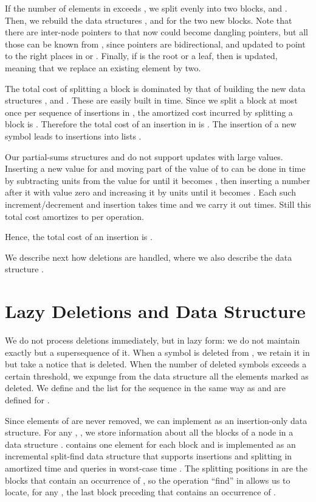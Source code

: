 \documentclass[11pt]{article}
\begin{document}
If the number of elements in  exceeds 
, we split  evenly into two blocks,  and 
.
Then, we rebuild the data structures ,  and  for the two new blocks.
Note that there are inter-node pointers to  that now could
become dangling pointers, but all those can be known from , since
pointers are bidirectional, and updated to point to the right places in
 or .
Finally, if  is the root or a leaf, then  is updated,
meaning that we replace an existing element by two.

The total cost of splitting a block is dominated by that
of building the new data structures ,  and .
These are easily built in  time. Since
we split a block  at most once per sequence of  
insertions in , the amortized cost incurred by splitting a block 
is . Therefore the total cost of an insertion in  is .
The insertion of a new 
symbol leads to  insertions into 
lists . 

Our partial-sums structures  and  do not support updates with large 
values. Inserting a new value for  and moving part of the value 
of  to  can be done in 
 time by subtracting  units from
the value for  until it becomes , then inserting a number after
it with value zero and increasing it by  units until it becomes
. Each such increment/decrement and insertion takes
 time \cite[Lem.~1]{NS10} and we carry it out
 times. Still this total cost amortizes to  per operation.

Hence, the total cost of an insertion is .

We describe next how deletions are handled, where
we also describe the data structure . 

\section{Lazy Deletions and Data Structure }
\label{sec:rank}

We do not process deletions immediately, but in lazy form: we do not
maintain exactly  but a supersequence  of it. When a symbol  is 
deleted from , we retain it in  but take a notice that 
 is deleted. When the number of deleted symbols exceeds 
a certain threshold, we expunge from the data structure all the elements 
marked as deleted.
We define  and the list  for the sequence 
 in the same way as  and  are defined for 
.

Since elements of  are never removed, we can implement 
 as an insertion-only data structure. For any 
, , we store information about all the blocks 
of a node  in a data structure . 
 contains one element for each block  and is 
implemented as an incremental split-find data structure that supports 
insertions and splitting in  amortized time and queries in  
worst-case time 
\cite{IA84}. The splitting positions in  are the blocks  that 
contain an occurrence of , so the operation ``find'' in  allows us 
to locate, for any , the last block preceding  that contains 
an occurrence of . 
\end{document}
